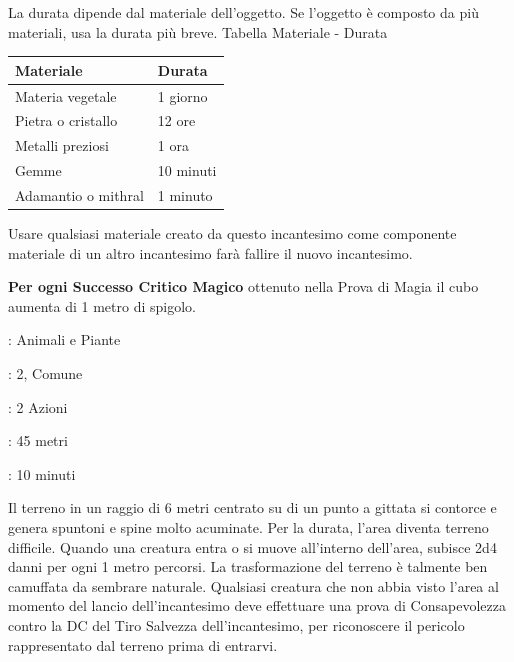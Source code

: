 \begin{multicols}{2}
La durata dipende dal materiale dell'oggetto. Se l'oggetto è composto da più materiali, usa la durata più breve.
\medskip
Tabella Materiale - Durata
\medskip

\noindent\begin{tabularx}{\linewidth}{lX}
	\toprule
	\textbf{Materiale} & \textbf{Durata}\\
	\toprule
 \rowcolor{gray!20}Materia vegetale &1 giorno\\
	Pietra o cristallo &12 ore\\
 \rowcolor{gray!20}Metalli preziosi &1 ora\\
	Gemme &10 minuti\\
 \rowcolor{gray!20}Adamantio o mithral &1 minuto
\end{tabularx}
\medskip

Usare qualsiasi materiale creato da questo incantesimo come componente materiale di un altro incantesimo farà fallire il nuovo incantesimo.

\textbf{Per ogni Successo Critico Magico} ottenuto nella Prova di Magia il cubo aumenta di 1 metro di spigolo.

\noindent\colorbox{OBSSgold!10}{
\begin{minipage}{0.95\linewidth}
\begin{description}[noitemsep, topsep=0pt, parsep=0pt, partopsep=0pt, leftmargin=0cm, labelwidth=1.3cm]
	\item[\textbf{Lista}]: Animali e Piante
	\item[\textbf{Livello}]: 2, Comune
	\item[\textbf{Lancio}]: 2 Azioni
	\item[\textbf{Gittata}]: 45 metri
	\item[\textbf{Durata}]: 10 minuti
\end{description}
\end{minipage}}\smallskip

Il terreno in un raggio di 6 metri centrato su di un punto a gittata si contorce e genera spuntoni e spine molto acuminate. Per la durata, l'area diventa terreno difficile. Quando una creatura entra o si muove all'interno dell'area, subisce 2d4 danni per ogni 1 metro percorsi.
La trasformazione del terreno è talmente ben camuffata da sembrare naturale. Qualsiasi creatura che non abbia visto l'area al momento del lancio dell'incantesimo deve effettuare una prova di Consapevolezza contro la DC del Tiro Salvezza dell'incantesimo, per riconoscere il pericolo rappresentato dal terreno prima di entrarvi.


\end{multicols}
